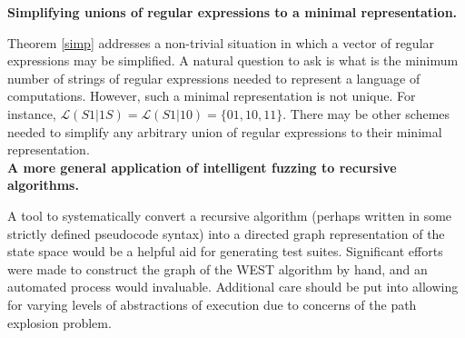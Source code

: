 \documentclass[runningheads]{llncs}
\begin{document}
\noindent \textbf{Simplifying unions of regular expressions to a minimal representation.}

Theorem \ref{simp} addresses a non-trivial situation in which a vector of regular expressions may be simplified. A natural question to ask is what is the minimum number of strings of regular expressions needed to represent a language of computations. However, such a minimal representation is not unique. For instance, $\mathscr{L}(S1|1S) = \mathscr{L}(S1|10) = \{01, 10, 11\}$. There may be other schemes needed to simplify any arbitrary union of regular expressions to their minimal representation.\\

\noindent \textbf{A more general application of intelligent fuzzing to recursive algorithms.}

A tool to systematically convert a recursive algorithm (perhaps written in some strictly defined pseudocode syntax) into a directed graph representation of the state space would be a helpful aid for generating test suites. 
Significant efforts were made to construct the graph of the WEST algorithm by hand, and an automated process would invaluable. 
Additional care should be put into allowing for varying levels of abstractions of execution due to concerns of the path explosion problem. 






\end{document}
